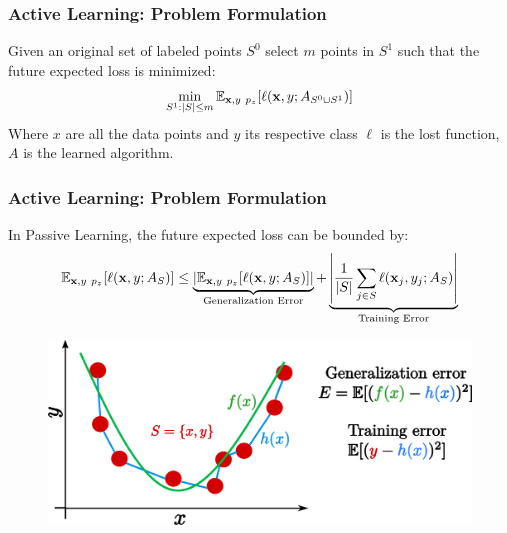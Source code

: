 \documentclass[11pts]{beamer}
\begin{document}
\begin{frame}%
\frametitle{Active Learning: Problem Formulation}

Given an original set of labeled points $S^{0}$ select  $m$ points in $S^{1}$  such that the future expected  loss is minimized:
\begin{equation}
    \min_{S^{1}:|S|\leq m} \mathbb{E}_{\mathbf{x},y~\mathnormal{p}_{z}}[\ell(\mathbf{x},y;A_{S^0 \cup S^{1}})]
\end{equation}
Where $x$ are all the data points and $y$ its respective class $\ell$ is the lost function, $A$ is the learned algorithm.


\end{frame}


\begin{frame}%
\frametitle{Active Learning: Problem Formulation}

In Passive Learning, the future expected  loss can be bounded by:
\begin{multline*}
    \mathbb{E}_{\mathbf{x},y~\mathnormal{p}_{z}}[\ell(\mathbf{x},y;A_{S})]\leq \underbrace{\left|\mathbb{E}_{\mathbf{x},y~\mathnormal{p}_{z}}[\ell(\mathbf{x},y;A_{S})]\right|}_{\text{Generalization Error}}+\underbrace{\left|\frac{1}{|S|}\sum_{j\in S}\ell(\mathbf{x}_{j},y_{j};A_{S})\right|}_{\text{Training Error}}
\end{multline*}
\begin{figure}
    \centering
    \includegraphics[scale=0.4]{IM/VAR_BIAS_CORE_P.pdf}
\end{figure}

\end{frame}
\end{document}
